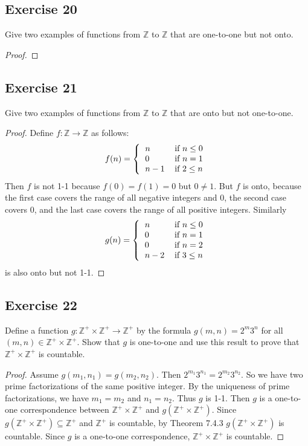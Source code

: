 \documentclass[14pt]{extarticle}
\newcommand{\Z}{\mathbb{Z}}
\begin{document}
\subsection{Exercise 20}
Give two examples of functions from $\Z$ to $\Z$ that are one-to-one but not onto.

\begin{proof}

\end{proof}

\subsection{Exercise 21}
Give two examples of functions from $\Z$ to $\Z$ that are onto but not one-to-one.

\begin{proof}
Define \(f: \Z \to \Z\) as follows:
\[
f(n) =
\left\{
\begin{tabular}{ll}
\(n\) & if \(n \leq 0\) \\
\(0\) & if \(n = 1\) \\
\(n-1\) & if \(2 \leq n\)
\end{tabular}
\right.
\]
Then $f$ is not 1-1 because \(f(0) = f(1) = 0\) but \(0 \neq 1\). But $f$ is onto, because the first case covers 
the range of all negative integers and 0, the second case covers 0, and the last case covers the range of all positive integers. Similarly
\[
g(n) =
\left\{
\begin{tabular}{ll}
\(n\) & if \(n \leq 0\) \\
\(0\) & if \(n = 1\) \\
\(0\) & if \(n = 2\) \\
\(n-2\) & if \(3 \leq n\)
\end{tabular}
\right.
\]
is also onto but not 1-1.
\end{proof}

\subsection{Exercise 22}
Define a function \(g: \Z^+ \times \Z^+ \to \Z^+\) by the formula \(g(m, n) = 2^m3^n\) for all \((m, n) \in \Z^+ 
\times \Z^+\). Show that $g$ is one-to-one and use this result to prove that \(\Z^+ \times \Z^+\) is countable.

\begin{proof}
Assume \(g(m_1, n_1) = g(m_2, n_2)\). Then \(2^{m_1}3^{n_1} = 2^{m_2}3^{n_2}\). So we have two prime factorizations of
the same positive integer. By the uniqueness of prime factorizations, we have \(m_1 = m_2\) and \(n_1 = n_2\).
Thus $g$ is 1-1. Then $g$ is a one-to-one correspondence between \(\Z^+ \times \Z^+\) and \(g(\Z^+ \times \Z^+)\).
Since \(g(\Z^+ \times \Z^+) \subseteq \Z^+\) and $\Z^+$ is countable, by Theorem 7.4.3 \(g(\Z^+ \times \Z^+)\) is
countable. Since $g$ is a one-to-one correspondence, \(\Z^+ \times \Z^+\) is countable.
\end{proof}
\end{document}
